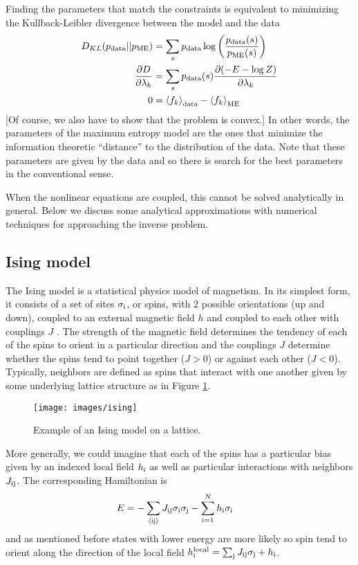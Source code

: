 \documentclass[aps,prl,twocolumn]{revtex4-1}
\begin{document}
Finding the parameters that match the constraints is equivalent to minimizing the Kullback-Leibler divergence between the model and the data \cite{Cover:2006tl}
\begin{align}
	D_{KL}(p_{\rm data}||p_{\rm ME}) &= \sum_s p_{\rm data} \log\left(\frac{p_{\rm data}(s)}{p_{\rm ME}(s)}\right)\\
	\frac{\partial D}{\partial \lambda_k} &= \sum_s p_{\rm data}(s) \frac{\partial (-E-\log Z)}{\partial \lambda_k}\label{eq:dkl deriv}\\
	0 &= \left<f_k\right>_{\rm data} -\left<f_k\right>_{\rm ME}\label{eq:fk-fk}
\end{align}
[Of course, we also have to show that the problem is convex.] In other words, the parameters of the maximum entropy model are the ones that minimize the information theoretic ``distance'' to the distribution of the data. Note that these parameters are given by the data and so there is search for the best parameters in the conventional sense.

When the nonlinear equations are coupled, this cannot be solved analytically in general. Below we discuss some analytical approximations with numerical techniques for approaching the inverse problem.

\subsection{Ising model}
The Ising model is a statistical physics model of magnetism. In its simplest form, it consists of a set of sites $\sigma_{\rm i}$, or spins, with 2 possible orientations (up and down), coupled to an external magnetic field $h$ and coupled to each other with couplings $J$ \cite{Reif:2009uf}. The strength of the magnetic field determines the tendency of each of the spins to orient in a particular direction and the couplings $J$ determine whether the spins tend to point together ($J>0$) or against each other ($J<0$). Typically, neighbors are defined as spins that interact with one another given by some underlying lattice structure as in Figure \ref{gr:ising}.

\begin{figure}[htbp]\centering
	\texttt{[image: images/ising]}
\caption{Example of an Ising model on a lattice.}
\label{gr:ising}
\end{figure}

More generally, we could imagine that each of the spins has a particular bias given by an indexed local field $h_{\rm i}$ as well as particular interactions with neighbors $J_{\rm ij}$. The corresponding Hamiltonian is
\begin{align}
	E &= -\sum_{\rm \left<ij\right>} J_{\rm ij}\sigma_{\rm i}\sigma_{\rm j} -\sum_{\rm i=1}^Nh_{\rm i}\sigma_{\rm i}
\end{align}
and as mentioned before states with lower energy are more likely so spin tend to orient along the direction of the local field $h_{\rm i}^{\rm local} = \sum_{\rm j}J_{\rm ij}\sigma_{\rm j} +h_{\rm i}$. 
\end{document}
